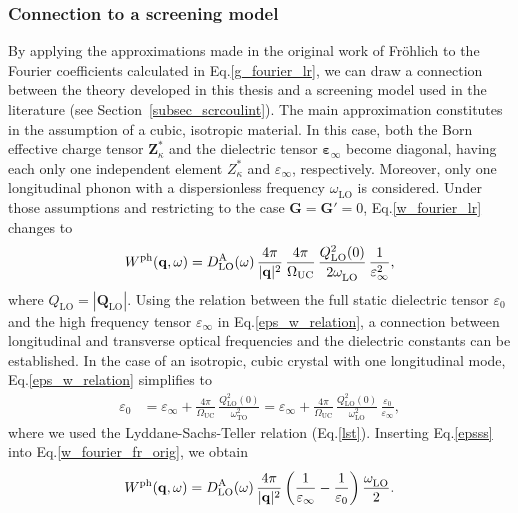 \subsubsection{Connection to a screening model}\label{subsec_scr_model}
By applying the approximations made in the original work of Fr\"ohlich\cite{froehlich} to the Fourier coefficients calculated in Eq.\;\eqref{g_fourier_lr}, we can draw a connection between the theory developed in this thesis and  a screening model used in the literature (see Section~\ref{subsec_scrcoulint}). The main approximation constitutes in the assumption of a cubic, isotropic material. In this case, both the Born effective charge tensor $\mathbf{Z}^*_\kappa$ and the dielectric tensor $\boldsymbol{\varepsilon}_\infty$ become diagonal, having each only one independent element $Z^*_\kappa$ and $\varepsilon_\infty$, respectively. Moreover, only one longitudinal phonon with a dispersionless frequency  $\omega^{\phantom{I}}_\text{LO}$ is considered.  Under those assumptions and restricting to the case $\mathbf{G=G'}=0$, Eq.\;\eqref{w_fourier_lr} changes to 
%
\begin{align}\label{w_fourier_fr_orig}
 W^\text{ph}(\mathbf{q},\omega)  = D^\text{A}_\text{LO}(\omega)\, \frac{4\pi}{|\mathbf{q}|^2}\,\frac{4\pi}{\Omega_\text{UC}}\,\frac{Q^2_\text{LO}(0)}{2\omega^{\phantom{I}}_\text{LO}}\,\frac{1}{\varepsilon^2_\infty}, 
\end{align}
%
where $Q_\text{LO}=|\mathbf{Q}_\text{LO}|$. Using  the relation between the full static dielectric tensor $\varepsilon_0$ and the high frequency tensor $\varepsilon_\infty$ in Eq.\;\eqref{eps_w_relation}, a connection between longitudinal and transverse optical frequencies and the dielectric constants can be established. In the case of an isotropic, cubic crystal with one longitudinal mode,  Eq.\;\eqref{eps_w_relation}  simplifies to 
%
\begin{equation}\label{epsss}
\begin{aligned}
    \varepsilon_0 & = \varepsilon_\infty + \frac{4\pi}{\Omega_\text{UC}}\,\frac{Q^2_\text{LO}(0)}{\omega^2_\text{TO}} = \varepsilon_\infty + \frac{4\pi}{\Omega_\text{UC}}\,\frac{Q^2_\text{LO}(0)}{\omega^2_\text{LO}}\,\frac{\varepsilon_0}{\varepsilon_\infty},
\end{aligned}
\end{equation}
where we used the  Lyddane-Sachs-Teller relation (Eq.\;\eqref{lst}). Inserting Eq.\;\eqref{epsss} into Eq.\;\eqref{w_fourier_fr_orig}, we obtain
%
\begin{align}\label{w_fourier_fr_final}
 W^\text{ph}(\mathbf{q},\omega)  = D^\text{A}_\text{LO}(\omega)\, \frac{4\pi}{|\mathbf{q}|^2}\left(\frac{1}{\varepsilon_\infty}-\frac{1}{\varepsilon_0}\right)\frac{{\omega^{\phantom{I}}_\text{LO}}}{2}. 
\end{align}
